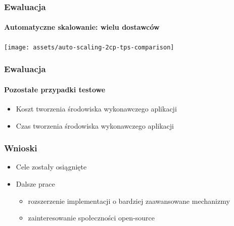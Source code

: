 \documentclass{beamer}
\begin{document}
\begin{frame}
\frametitle{Ewaluacja}
\framesubtitle{Automatyczne skalowanie: wielu dostawców}

\begin{center}
\texttt{[image: assets/auto-scaling-2cp-tps-comparison]}
\end{center}

\end{frame}


\begin{frame}
\frametitle{Ewaluacja}
\framesubtitle{Pozostałe przypadki testowe}

\begin{itemize}
	\item Koszt tworzenia środowiska wykonawczego aplikacji
	\item Czas tworzenia środowiska wykonawczego aplikacji
\end{itemize}

\end{frame}


\begin{frame}
\frametitle{Wnioski}

\begin{itemize}
	\item Cele zostały osiągnięte
	\item Dalsze prace
		\begin{itemize}
			\item rozszerzenie implementacji o bardziej zaawansowane mechanizmy
			\item zainteresowanie społeczności open-source 
		\end{itemize}
\end{itemize}

\end{frame}
\end{document}
